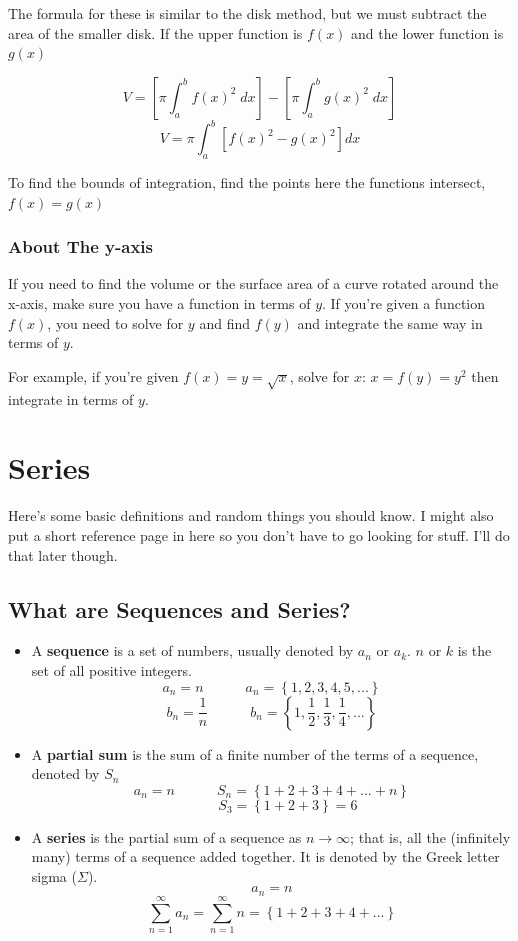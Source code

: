 \documentclass[12pt]{report}
\begin{document}
The formula for these is similar to the disk method, but we must subtract the area of the smaller disk. If the upper function is $f(x)$ and the lower function is $g(x)$

$$ V = \left[ \pi \int_a^b f(x)^2 \; dx \right] - \left[ \pi \int_a^b g(x)^2 \; dx \right] $$
$$ V = \pi \int_a^b \left[ f(x)^2 - g(x)^2 \right] dx $$

To find the bounds of integration, find the points here the functions intersect, $f(x) = g(x)$


\subsection*{About The y-axis}
If you need to find the volume or the surface area of a curve rotated around the x-axis, make sure you have a function in terms of $y$. If you're given a function $f(x)$, you need to solve for $y$ and find $f(y)$ and integrate the same way in terms of $y$.

For example, if you're given $f(x) = y = \sqrt{x} $, solve for $x$: $x = f(y) = y^2$ then integrate in terms of $y$.



\clearpage





\chapter{Series}
Here's some basic definitions and random things you should know. I might also put a short reference page in here so you don't have to go looking for stuff. I'll do that later though. 

\section{What are Sequences and Series?}

\begin{itemize}
	\item[] A \textbf{sequence} is a set of numbers, usually denoted by $a_n$ or $a_k$. $n$ or $k$ is the set of all positive integers.
		$$ a_n = n \quad \quad \quad a_n = \left\{ 1, 2, 3, 4, 5, ... \right\} $$
		$$ b_n = \frac{1}{n} \quad \quad \quad b_n = \left\{ 1, \frac{1}{2}, \frac{1}{3}, \frac{1}{4}, ... \right\} $$
		
		
	
	\item[] A \textbf{partial sum} is the sum of a finite number of the terms of a sequence, denoted by $S_n$
		$$ a_n = n \quad \quad \quad S_n = \left\{1 + 2 + 3 + 4 + ... + n\right\} $$
		$$ \quad \quad \; S_3 = \left\{ 1 + 2 + 3 \right\} = 6 $$
		
		
	\item[] A \textbf{series} is the partial sum of a sequence as $n\to\infty$; that is, all the (infinitely many) terms of a sequence added together. It is denoted by the Greek letter sigma ($\Sigma$).
		$$ a_n = n $$
		$$ \sum_{n=1}^{\infty} a_n = \sum_{n=1}^{\infty} n = \left\{ 1 + 2 + 3 + 4 + ... \right\}$$
\end{itemize}
\end{document}

